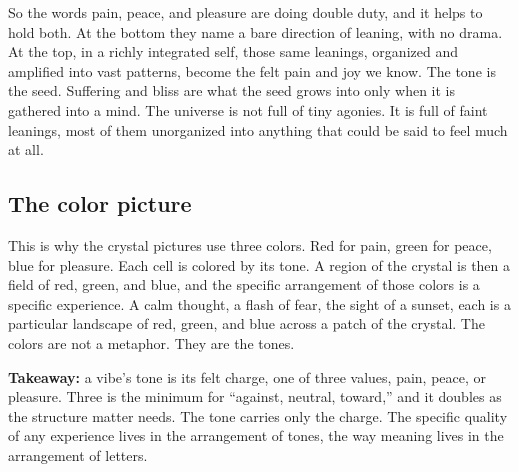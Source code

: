 So the words pain, peace, and pleasure are doing double duty, and it helps to hold both. At the bottom they name a bare direction of leaning, with no drama. At the top, in a richly integrated self, those same leanings, organized and amplified into vast patterns, become the felt pain and joy we know. The tone is the seed. Suffering and bliss are what the seed grows into only when it is gathered into a mind. The universe is not full of tiny agonies. It is full of faint leanings, most of them unorganized into anything that could be said to feel much at all.

\subsection{The color picture}

This is why the crystal pictures use three colors. Red for pain, green for peace, blue for pleasure. Each cell is colored by its tone. A region of the crystal is then a field of red, green, and blue, and the specific arrangement of those colors is a specific experience. A calm thought, a flash of fear, the sight of a sunset, each is a particular landscape of red, green, and blue across a patch of the crystal. The colors are not a metaphor. They are the tones.

\textbf{Takeaway:} a vibe's tone is its felt charge, one of three values, pain, peace, or pleasure. Three is the minimum for ``against, neutral, toward,'' and it doubles as the structure matter needs. The tone carries only the charge. The specific quality of any experience lives in the arrangement of tones, the way meaning lives in the arrangement of letters.
